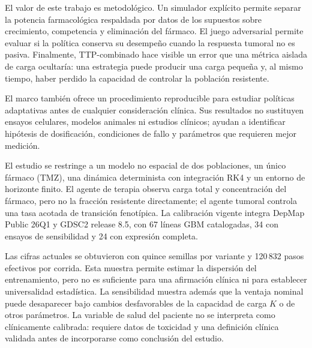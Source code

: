 
El valor de este trabajo es metodológico. Un simulador explícito permite separar la potencia farmacológica respaldada por datos de los supuestos sobre crecimiento, competencia y eliminación del fármaco. El juego adversarial permite evaluar si la política conserva su desempeño cuando la respuesta tumoral no es pasiva. Finalmente, TTP-combinado hace visible un error que una métrica aislada de carga ocultaría: una estrategia puede producir una carga pequeña y, al mismo tiempo, haber perdido la capacidad de controlar la población resistente.

El marco también ofrece un procedimiento reproducible para estudiar políticas adaptativas antes de cualquier consideración clínica. Sus resultados no sustituyen ensayos celulares, modelos animales ni estudios clínicos; ayudan a identificar hipótesis de dosificación, condiciones de fallo y parámetros que requieren mejor medición.


El estudio se restringe a un modelo no espacial de dos poblaciones, un único fármaco (TMZ), una dinámica determinista con integración RK4 y un entorno de horizonte finito. El agente de terapia observa carga total y concentración del fármaco, pero no la fracción resistente directamente; el agente tumoral controla una tasa acotada de transición fenotípica. La calibración vigente integra DepMap Public 26Q1 y GDSC2 release 8.5, con 67 líneas GBM catalogadas, 34 con ensayos de sensibilidad y 24 con expresión completa.

Las cifras actuales se obtuvieron con quince semillas por variante y 120\,832 pasos efectivos por corrida. Esta muestra permite estimar la dispersión del entrenamiento, pero no es suficiente para una afirmación clínica ni para establecer universalidad estadística. La sensibilidad muestra además que la ventaja nominal puede desaparecer bajo cambios desfavorables de la capacidad de carga $K$ o de otros parámetros. La variable de salud del paciente no se interpreta como clínicamente calibrada: requiere datos de toxicidad y una definición clínica validada antes de incorporarse como conclusión del estudio.
